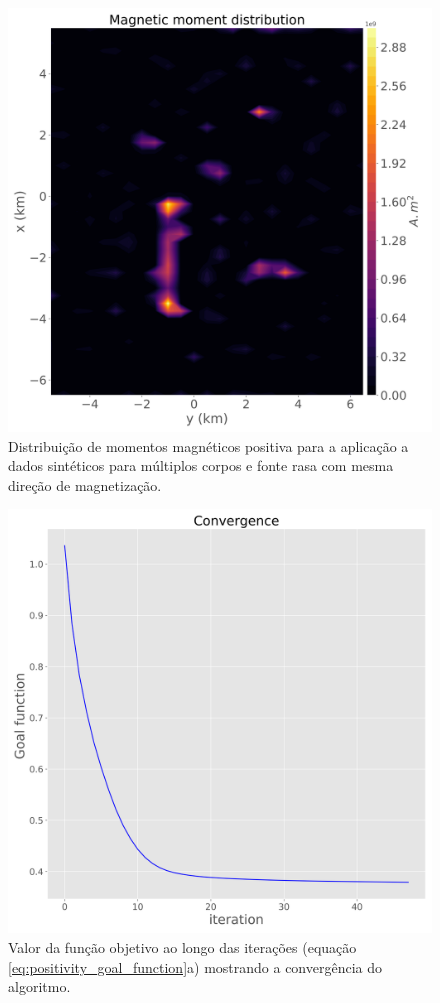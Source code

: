 \begin{figure}
	\centering
	\includegraphics[width=.9\textwidth]{Fig/eqlayer/unidir_shallow_test/magnetic_moment_positive_LM_NNLS_magRM.png}
	\caption{Distribuição de momentos magnéticos positiva para a aplicação a dados sintéticos para múltiplos corpos e fonte rasa com mesma direção de magnetização.}
	\label{fig:dist_momentos_pos_2}
\end{figure}

\begin{figure}
	\centering
	\includegraphics[width=.9\textwidth]{Fig/eqlayer/unidir_shallow_test/convergence_LM_NNLS_magRM.png}
	\caption{Valor da função objetivo ao longo das iterações (equação \ref{eq:positivity_goal_function}a) mostrando a convergência do algoritmo.}
	\label{fig:convergence_2}
\end{figure}

